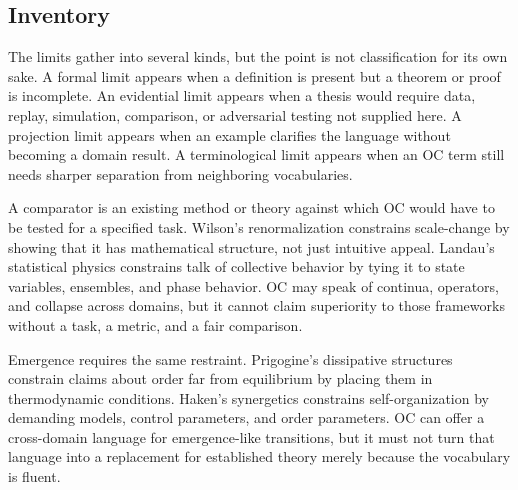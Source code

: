 \documentclass[11pt,a4paper,openany]{book}
\begin{document}
\subsection{Inventory}
The limits gather into several kinds, but the point is not classification for its own sake. A formal limit appears when a definition is present but a theorem or proof is incomplete. An evidential limit appears when a thesis would require data, replay, simulation, comparison, or adversarial testing not supplied here. A projection limit appears when an example clarifies the language without becoming a domain result. A terminological limit appears when an OC term still needs sharper separation from neighboring vocabularies. \cite{wilson_renormalization,landau_stat_physics}\par
A comparator is an existing method or theory against which OC would have to be tested for a specified task. Wilson's renormalization constrains scale-change by showing that it has mathematical structure, not just intuitive appeal. Landau's statistical physics constrains talk of collective behavior by tying it to state variables, ensembles, and phase behavior. OC may speak of continua, operators, and collapse across domains, but it cannot claim superiority to those frameworks without a task, a metric, and a fair comparison.\par
Emergence requires the same restraint. Prigogine's dissipative structures constrain claims about order far from equilibrium by placing them in thermodynamic conditions. Haken's synergetics constrains self-organization by demanding models, control parameters, and order parameters. OC can offer a cross-domain language for emergence-like transitions, but it must not turn that language into a replacement for established theory merely because the vocabulary is fluent.\par
\end{document}
